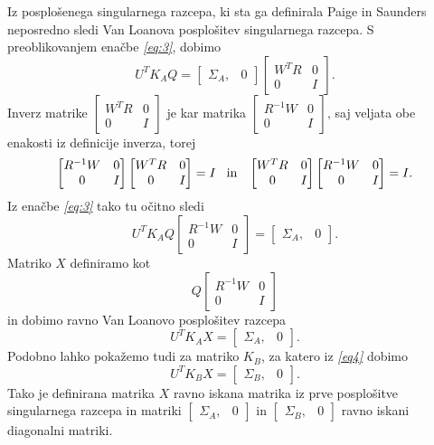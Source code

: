 \documentclass[mat1]{article}
\begin{document}
Iz posplošenega singularnega razcepa, ki sta ga definirala Paige in Saunders neposredno sledi Van Loanova posplošitev singularnega razcepa. 
S preoblikovanjem enačbe \textit{\eqref{eq:3}}, dobimo
$$U^T K_A Q = \left[\begin{array}{cc} \Sigma_A, & 0 \end{array}\right]
\begin{bmatrix}
W^TR & 0 \\
0 & I 
\end{bmatrix} \text{.}$$
Inverz matrike
$\begin{bmatrix}
W^TR & 0 \\
0 & I 
\end{bmatrix} $
je kar matrika 
$\begin{bmatrix}
R^{-1} W & 0 \\
0 & I 
\end{bmatrix} \text{,}$
saj veljata obe enakosti iz definicije inverza, torej
$$\begin{bmatrix}
R^{-1} W & 0 \\
0 & I 
\end{bmatrix}
\begin{bmatrix}
W^TR & 0 \\
0 & I 
\end{bmatrix}
= I \hspace{3mm}\text{in} \hspace{3mm}
\begin{bmatrix}
W^TR & 0 \\
0 & I 
\end{bmatrix}
\begin{bmatrix}
R^{-1} W & 0 \\
0 & I 
\end{bmatrix}
= I \text{.}$$
Iz enačbe \textit{\eqref{eq:3}} tako tu očitno sledi
$$ U^T K_A Q
\begin{bmatrix}
R^{-1} W & 0 \\
0 & I 
\end{bmatrix}
=
\left[\begin{array}{cc} \Sigma_A, & 0 \end{array}\right] \text{.}
$$
Matriko $X$ definiramo kot
$$ Q
\begin{bmatrix}
R^{-1} W & 0 \\
0 & I 
\end{bmatrix}
$$ in dobimo ravno Van Loanovo posplošitev razcepa
$$ U^T K_A X = \left[\begin{array}{cc} \Sigma_A, & 0 \end{array}\right] \text{.}
$$
Podobno lahko pokažemo tudi za matriko $K_B$, za katero iz \textit{\eqref{eq4}} dobimo
$$ U^T K_B X = \left[\begin{array}{cc} \Sigma_B, & 0 \end{array}\right] \text{.}
$$
Tako je definirana matrika $X$ ravno iskana matrika iz prve posplošitve singularnega razcepa in matriki $\left[\begin{array}{cc} \Sigma_A, & 0 \end{array}\right]$ in $\left[\begin{array}{cc} \Sigma_B, & 0 \end{array}\right]$ ravno iskani diagonalni matriki.
\end{document}
